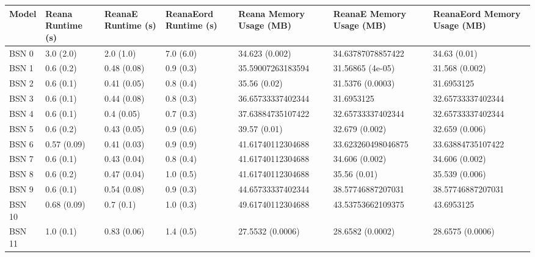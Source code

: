 \begin{tabular}{lllllll}
\toprule
 Model & Reana Runtime (s) & ReanaE Runtime (s) & ReanaEord Runtime (s) & Reana Memory Usage (MB) & ReanaE Memory Usage (MB) & ReanaEord Memory Usage (MB) \\
\midrule
 BSN 0 &         3.0 (2.0) &          2.0 (1.0) &             7.0 (6.0) &          34.623 (0.002) &        34.63787078857422 &                34.63 (0.01) \\
 BSN 1 &         0.6 (0.2) &        0.48 (0.08) &             0.9 (0.3) &       35.59007263183594 &         31.56865 (4e-05) &              31.568 (0.002) \\
 BSN 2 &         0.6 (0.1) &        0.41 (0.05) &             0.8 (0.4) &            35.56 (0.02) &         31.5376 (0.0003) &                  31.6953125 \\
 BSN 3 &         0.6 (0.1) &        0.44 (0.08) &             0.8 (0.3) &       36.65733337402344 &               31.6953125 &           32.65733337402344 \\
 BSN 4 &         0.6 (0.1) &         0.4 (0.05) &             0.7 (0.3) &       37.63884735107422 &        32.65733337402344 &           32.65733337402344 \\
 BSN 5 &         0.6 (0.2) &        0.43 (0.05) &             0.9 (0.6) &            39.57 (0.01) &           32.679 (0.002) &              32.659 (0.006) \\
 BSN 6 &       0.57 (0.09) &        0.41 (0.03) &             0.9 (0.9) &       41.61740112304688 &       33.623260498046875 &           33.63884735107422 \\
 BSN 7 &         0.6 (0.1) &        0.43 (0.04) &             0.8 (0.4) &       41.61740112304688 &           34.606 (0.002) &              34.606 (0.002) \\
 BSN 8 &         0.6 (0.2) &        0.47 (0.04) &             1.0 (0.5) &       41.61740112304688 &             35.56 (0.01) &              35.539 (0.006) \\
 BSN 9 &         0.6 (0.1) &        0.54 (0.08) &             0.9 (0.3) &       44.65733337402344 &        38.57746887207031 &           38.57746887207031 \\
BSN 10 &       0.68 (0.09) &          0.7 (0.1) &             1.0 (0.3) &       49.61740112304688 &        43.53753662109375 &                  43.6953125 \\
BSN 11 &         1.0 (0.1) &        0.83 (0.06) &             1.4 (0.5) &        27.5532 (0.0006) &         28.6582 (0.0002) &            28.6575 (0.0006) \\

\end{tabular}
